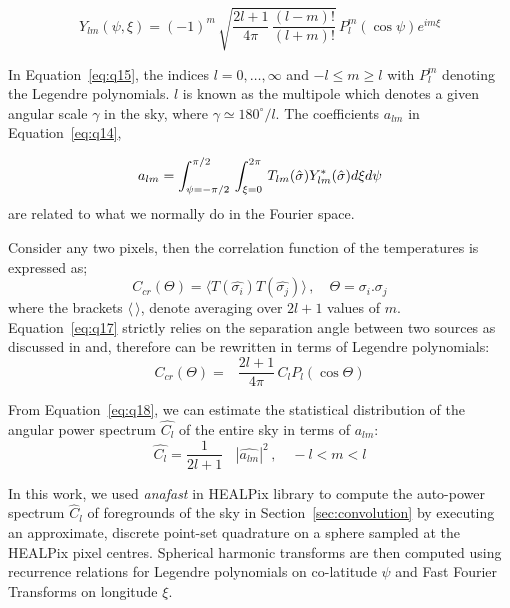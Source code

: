 \begin{equation} 	\label{eq:q15}
            Y_{lm}(\psi ,\xi) = (-1)^m \, \sqrt{\frac{2l + 1}{4\pi} \, \frac{(l - m)!}{(l + m)!}}\, P_{ l}^{m}(\cos \psi)e^{im\xi} 
		      \end{equation}

\noindent In Equation~\ref{eq:q15}, the indices $l = 0, \dots, \infty$ and $-l \leq m \geq l$ with $P_{ l}^{m}$ denoting the
Legendre polynomials. $l$ is known as the multipole which denotes a given angular scale $\gamma$ in the sky, where
$\gamma \simeq 180^{\circ}/l$. The coefficients $ a_{lm}$ in Equation~\ref{eq:q14},
 
 \begin{equation} 	  \label{eq:q16}
         a_{lm} = \int_{\psi = - \pi/2}^{\pi/2} \,\int_{\xi = 0}^{2\pi} \, T_{lm}(\hat{\sigma})Y_{lm}^{*}(\hat{\sigma})\mathnormal{{d\xi}{d\psi}}                            
		      \end{equation}
%
are related to what we normally do in the Fourier space.
%

Consider any two pixels, then the correlation function of the temperatures is expressed as;
  \begin{equation}		\label{eq:q17}   
   C_{cr}(\Theta) = \langle T(\hat{\sigma_i})T(\hat{\sigma_j})\rangle \, , \quad \Theta = \sigma_{i}.\sigma_{j}   
  \end{equation}
%
 where the brackets $\langle \, \rangle$, denote averaging over $2l+1$ values of $m$. Equation~\ref{eq:q17} 
strictly relies on the separation angle between two sources as discussed in \citep[p. 78]{1997Schramm} and, therefore can be rewritten in terms of Legendre polynomials:
%
\begin{equation}  	 \label{eq:q18}
   C_{cr}(\Theta) = \mathop{\sum_{l\, = 0}}\, \frac{2l + 1}{4\pi}\,C_{l}P_{l}(\cos \Theta)  
  \end{equation}
  
\noindent From Equation~\ref{eq:q18}, we can estimate the statistical distribution of the angular power spectrum $\hat{C_l}$ of the entire sky in terms of $a_{lm}$:
 \begin{equation}  	\label{eq:q19}
  \hat{C_l} = \frac{1}{2l + 1}\, \mathop{\sum_{m}}\, |\hat{a_{lm}}|^{2} \, , \quad -l < m < l 	
\end{equation}
% 

In this work, we used \emph{anafast} in HEALPix library to compute the auto-power spectrum $\hat{C}_{l}$ of foregrounds of the sky
in Section~\ref{sec:convolution} by executing an approximate, discrete point-set quadrature on a sphere sampled at the HEALPix pixel centres.
Spherical harmonic transforms are then computed using recurrence relations for Legendre polynomials on co-latitude $\psi$ and Fast Fourier Transforms on longitude $\xi$.

